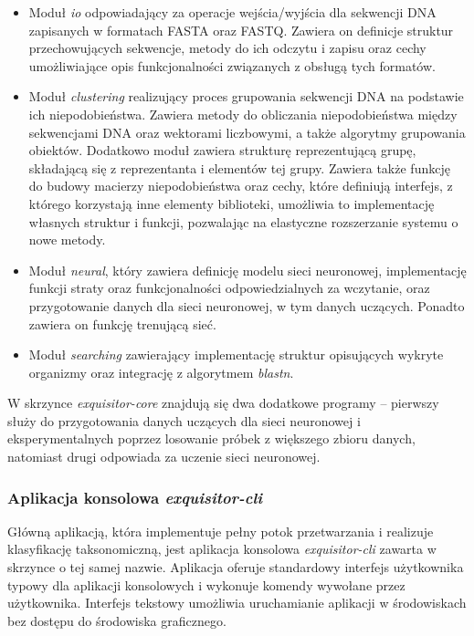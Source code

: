             \begin{itemize}
                \item {
                    Moduł \textit{io} odpowiadający za operacje wejścia/wyjścia dla sekwencji DNA zapisanych w formatach FASTA oraz FASTQ. Zawiera on definicje struktur przechowujących sekwencje, metody do ich odczytu i zapisu oraz cechy umożliwiające opis funkcjonalności związanych z obsługą tych formatów.
                }
                \item {
                    Moduł \textit{clustering} realizujący proces grupowania sekwencji DNA na podstawie ich niepodobieństwa. Zawiera metody do obliczania niepodobieństwa między sekwencjami DNA oraz wektorami liczbowymi, a także algorytmy grupowania obiektów. Dodatkowo moduł zawiera strukturę reprezentującą grupę, składającą się z reprezentanta i elementów tej grupy. Zawiera także funkcję do budowy macierzy niepodobieństwa oraz cechy, które definiują interfejs, z którego korzystają inne elementy biblioteki, umożliwia to implementację własnych struktur i funkcji, pozwalając na elastyczne rozszerzanie systemu o nowe metody.
                }
                \item {
                    Moduł \textit{neural}, który zawiera definicję modelu sieci neuronowej, implementację funkcji straty oraz funkcjonalności odpowiedzialnych za wczytanie, oraz przygotowanie danych dla sieci neuronowej, w tym danych uczących. Ponadto zawiera on funkcję trenującą sieć.
                }
                \item {
                    Moduł \textit{searching} zawierający implementację struktur opisujących wykryte organizmy oraz integrację z algorytmem \textit{blastn}.
                }
            \end{itemize}

            W skrzynce \textit{exquisitor-core} znajdują się dwa dodatkowe programy – pierwszy służy do przygotowania danych uczących dla sieci neuronowej i eksperymentalnych poprzez losowanie próbek z większego zbioru danych, natomiast drugi odpowiada za uczenie sieci neuronowej.

        \subsubsection{Aplikacja konsolowa \textit{exquisitor-cli}}
            Główną aplikacją, która implementuje pełny potok przetwarzania i realizuje klasyfikację taksonomiczną, jest aplikacja konsolowa \textit{exquisitor-cli} zawarta w skrzynce o tej samej nazwie. Aplikacja oferuje standardowy interfejs użytkownika typowy dla aplikacji konsolowych i wykonuje komendy wywołane przez użytkownika. Interfejs tekstowy umożliwia uruchamianie aplikacji w środowiskach bez dostępu do środowiska graficznego.

